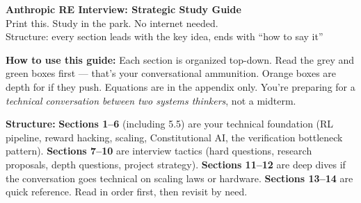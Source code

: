 \documentclass[10pt, letterpaper, twocolumn]{article}
\begin{document}
\begin{center}
  {\LARGE \textbf{Anthropic RE Interview: Strategic Study Guide}}\\[3pt]
  {\small Print this. Study in the park. No internet needed.}\\[1pt]
  {\small Structure: every section leads with the key idea, ends with ``how to say it''}
\end{center}

\medskip
\noindent\textbf{How to use this guide:} Each section is organized top-down. Read the grey and green boxes first --- that's your conversational ammunition. Orange boxes are depth for if they push. Equations are in the appendix only. You're preparing for a \textit{technical conversation between two systems thinkers}, not a midterm.

\noindent\textbf{Structure:} \textbf{Sections 1--6} (including 5.5) are your technical foundation (RL pipeline, reward hacking, scaling, Constitutional AI, the verification bottleneck pattern). \textbf{Sections 7--10} are interview tactics (hard questions, research proposals, depth questions, project strategy). \textbf{Sections 11--12} are deep dives if the conversation goes technical on scaling laws or hardware. \textbf{Sections 13--14} are quick reference. Read in order first, then revisit by need.







\end{document}
